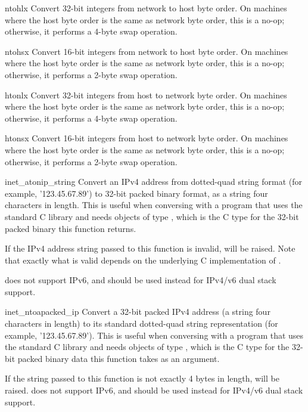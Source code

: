 \begin{funcdesc}{ntohl}{x}
Convert 32-bit integers from network to host byte order.  On machines
where the host byte order is the same as network byte order, this is a
no-op; otherwise, it performs a 4-byte swap operation.
\end{funcdesc}

\begin{funcdesc}{ntohs}{x}
Convert 16-bit integers from network to host byte order.  On machines
where the host byte order is the same as network byte order, this is a
no-op; otherwise, it performs a 2-byte swap operation.
\end{funcdesc}

\begin{funcdesc}{htonl}{x}
Convert 32-bit integers from host to network byte order.  On machines
where the host byte order is the same as network byte order, this is a
no-op; otherwise, it performs a 4-byte swap operation.
\end{funcdesc}

\begin{funcdesc}{htons}{x}
Convert 16-bit integers from host to network byte order.  On machines
where the host byte order is the same as network byte order, this is a
no-op; otherwise, it performs a 2-byte swap operation.
\end{funcdesc}

\begin{funcdesc}{inet_aton}{ip_string}
Convert an IPv4 address from dotted-quad string format (for example,
'123.45.67.89') to 32-bit packed binary format, as a string four
characters in length.  This is useful when conversing with a program
that uses the standard C library and needs objects of type
, which is the C type for the 32-bit packed
binary this function returns.

If the IPv4 address string passed to this function is invalid,
 will be raised. Note that exactly what is
valid depends on the underlying C implementation of
.

 does not support IPv6, and
 should be used instead for IPv4/v6 dual stack
support.
\end{funcdesc}

\begin{funcdesc}{inet_ntoa}{packed_ip}
Convert a 32-bit packed IPv4 address (a string four characters in
length) to its standard dotted-quad string representation (for
example, '123.45.67.89').  This is useful when conversing with a
program that uses the standard C library and needs objects of type
, which is the C type for the 32-bit packed
binary data this function takes as an argument.

If the string passed to this function is not exactly 4 bytes in
length,  will be raised.
 does not support IPv6, and
 should be used instead for IPv4/v6 dual stack
support.
\end{funcdesc}

